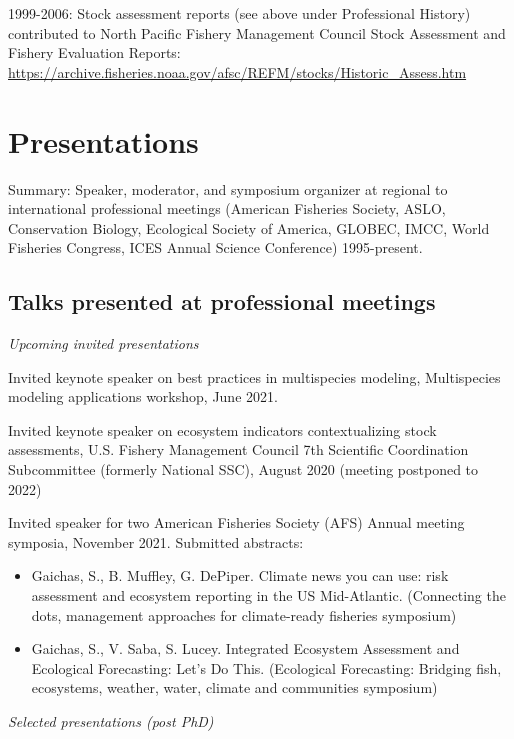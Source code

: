 \documentclass[11pt, a4paper]{awesome-cv}
\begin{document}
1999-2006: Stock assessment reports (see above under Professional
History) contributed to North Pacific Fishery Management Council Stock
Assessment and Fishery Evaluation Reports:
\url{https://archive.fisheries.noaa.gov/afsc/REFM/stocks/Historic_Assess.htm}

\hypertarget{presentations}{%
\section{Presentations}\label{presentations}}

Summary: Speaker, moderator, and symposium organizer at regional to
international professional meetings (American Fisheries Society, ASLO,
Conservation Biology, Ecological Society of America, GLOBEC, IMCC, World
Fisheries Congress, ICES Annual Science Conference) 1995-present.

\hypertarget{talks-presented-at-professional-meetings}{%
\subsection{Talks presented at professional
meetings}\label{talks-presented-at-professional-meetings}}

\emph{Upcoming invited presentations}

Invited keynote speaker on best practices in multispecies modeling,
Multispecies modeling applications workshop, June 2021.

Invited keynote speaker on ecosystem indicators contextualizing stock
assessments, U.S. Fishery Management Council 7th Scientific Coordination
Subcommittee (formerly National SSC), August 2020 (meeting postponed to
2022)

Invited speaker for two American Fisheries Society (AFS) Annual meeting
symposia, November 2021. Submitted abstracts:

\begin{itemize}
\item
  Gaichas, S., B. Muffley, G. DePiper. Climate news you can use: risk
  assessment and ecosystem reporting in the US Mid-Atlantic. (Connecting
  the dots, management approaches for climate-ready fisheries symposium)
\item
  Gaichas, S., V. Saba, S. Lucey. Integrated Ecosystem Assessment and
  Ecological Forecasting: Let's Do This. (Ecological Forecasting:
  Bridging fish, ecosystems, weather, water, climate and communities
  symposium)
\end{itemize}

\emph{Selected presentations (post PhD)}
\end{document}
